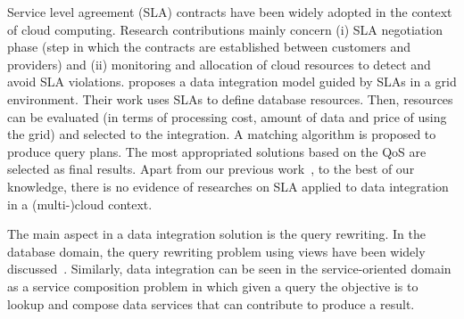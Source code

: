 Service level agreement (SLA) contracts have been widely adopted in the context of cloud computing. Research contributions mainly concern (i) SLA negotiation phase (step in which the contracts are established between customers and providers) and (ii) monitoring and allocation of cloud resources to detect and avoid SLA violations.
\cite{Nie07} proposes a data integration model guided by SLAs in a grid
environment. Their work uses SLAs to define database resources. Then, resources
can be evaluated (in terms of processing cost, amount of data and price of using the grid) and selected to the integration. A matching algorithm is proposed to produce query plans. The most appropriated solutions based on the QoS are selected as final results. Apart from our previous work~\cite{Bennani2014}, to the best of our knowledge, there is no evidence of researches on SLA applied to data integration in a (multi-)cloud context.


The main aspect in a data integration solution is the query rewriting. In the database domain, the query rewriting problem using views have been widely discussed~\cite{Halevy:2001,Levy:1996,Duschka:1997,Pottinger:2001}.
Similarly, data integration can be seen in the service-oriented domain as a service composition problem in which given a query the objective is to lookup and compose data services that can contribute to produce a result.
%

